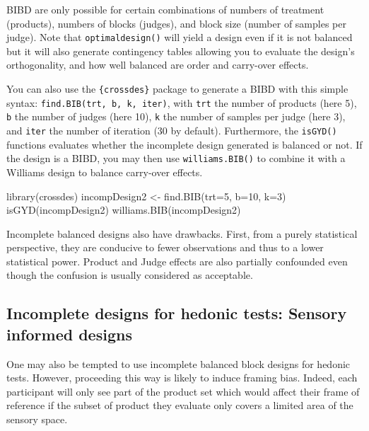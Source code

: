 \documentclass[
]{krantz}
\makeatletter
\newenvironment{Shaded}{\begin{snugshade}}{\end{snugshade}}
\newcommand{\AttributeTok}[1]{\textcolor[rgb]{0.61,0.61,0.61}{#1}}
\newcommand{\DecValTok}[1]{\textcolor[rgb]{0.06,0.06,0.06}{#1}}
\newcommand{\FunctionTok}[1]{\textcolor[rgb]{0,0,0}{#1}}
\newcommand{\NormalTok}[1]{#1}
\newcommand{\OtherTok}[1]{\textcolor[rgb]{0.37,0.37,0.37}{#1}}
\newenvironment{kframe}{%
\medskip{}
\setlength{\fboxsep}{.8em}
 \def\at@end@of@kframe{}%
 \ifinner\ifhmode%
  \def\at@end@of@kframe{\end{minipage}}%
  \begin{minipage}{\columnwidth}%
 \fi\fi%
 \def\FrameCommand##1{\hskip\@totalleftmargin \hskip-\fboxsep
 \colorbox{shadecolor}{##1}\hskip-\fboxsep
     \hskip-\linewidth \hskip-\@totalleftmargin \hskip\columnwidth}%
 \MakeFramed {\advance\hsize-\width
   \@totalleftmargin\z@ \linewidth\hsize
   \@setminipage}}%
 {\par\unskip\endMakeFramed%
 \at@end@of@kframe}
\renewenvironment{Shaded}{\begin{kframe}}{\end{kframe}}
\makeatother
\begin{document}
BIBD are only possible for certain combinations of numbers of treatment (products), numbers of blocks (judges), and block size (number of samples per judge). Note that \texttt{optimaldesign()} will yield a design even if it is not balanced but it will also generate contingency tables allowing you to evaluate the design's orthogonality, and how well balanced are order and carry-over effects.

You can also use the \texttt{\{crossdes\}} package to generate a BIBD with this simple syntax: \texttt{find.BIB(trt,\ b,\ k,\ iter)}, with \texttt{trt} the number of products (here 5), \texttt{b} the number of judges (here 10), \texttt{k} the number of samples per judge (here 3), and \texttt{iter} the number of iteration (30 by default). Furthermore, the \texttt{isGYD()} functions evaluates whether the incomplete design generated is balanced or not. If the design is a BIBD, you may then use \texttt{williams.BIB()} to combine it with a Williams design to balance carry-over effects.

\begin{Shaded}
\begin{Highlighting}[]
\FunctionTok{library}\NormalTok{(crossdes)}
\NormalTok{incompDesign2 }\OtherTok{\textless{}{-}} \FunctionTok{find.BIB}\NormalTok{(}\AttributeTok{trt=}\DecValTok{5}\NormalTok{, }\AttributeTok{b=}\DecValTok{10}\NormalTok{, }\AttributeTok{k=}\DecValTok{3}\NormalTok{)}
\FunctionTok{isGYD}\NormalTok{(incompDesign2)}
\FunctionTok{williams.BIB}\NormalTok{(incompDesign2)}
\end{Highlighting}
\end{Shaded}

Incomplete balanced designs also have drawbacks. First, from a purely statistical perspective, they are conducive to fewer observations and thus to a lower statistical power. Product and Judge effects are also partially confounded even though the confusion is usually considered as acceptable.

\hypertarget{incomplete-designs-for-hedonic-tests-sensory-informed-designs}{%
\subsection{Incomplete designs for hedonic tests: Sensory informed designs}\label{incomplete-designs-for-hedonic-tests-sensory-informed-designs}}

One may also be tempted to use incomplete balanced block designs for hedonic tests. However, proceeding this way is likely to induce framing bias. Indeed, each participant will only see part of the product set which would affect their frame of reference if the subset of product they evaluate only covers a limited area of the sensory space.
\end{document}
